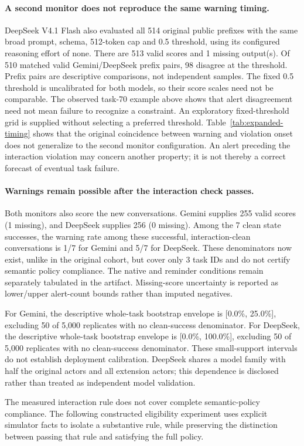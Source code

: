 \paragraph{A second monitor does not reproduce the same warning timing.}
DeepSeek V4.1 Flash also evaluated all 514 original public prefixes with the same broad prompt, schema, 512-token cap and 0.5 threshold, using its configured reasoning effort of none. There are 513 valid scores and 1 missing output(s). Of 510 matched valid Gemini/DeepSeek prefix pairs, 98 disagree at the threshold. Prefix pairs are descriptive comparisons, not independent samples. The fixed 0.5 threshold is uncalibrated for both models, so their score scales need not be comparable. The observed task-70 example above shows that alert disagreement need not mean failure to recognize a constraint. An exploratory fixed-threshold grid is supplied without selecting a preferred threshold. Table~\ref{tab:expanded-timing} shows that the original coincidence between warning and violation onset does not generalize to the second monitor configuration. An alert preceding the interaction violation may concern another property; it is not thereby a correct forecast of eventual task failure.

\paragraph{Warnings remain possible after the interaction check passes.}
Both monitors also score the new conversations. Gemini supplies 255 valid scores (1 missing), and DeepSeek supplies 256 (0 missing). Among the 7 clean state successes, the warning rate among these successful, interaction-clean conversations is 1/7 for Gemini and 5/7 for DeepSeek. These denominators now exist, unlike in the original cohort, but cover only 3 task IDs and do not certify semantic policy compliance. The native and reminder conditions remain separately tabulated in the artifact. Missing-score uncertainty is reported as lower/upper alert-count bounds rather than imputed negatives.

For Gemini, the descriptive whole-task bootstrap envelope is [0.0\%, 25.0\%], excluding 50 of 5,000 replicates with no clean-success denominator. For DeepSeek, the descriptive whole-task bootstrap envelope is [0.0\%, 100.0\%], excluding 50 of 5,000 replicates with no clean-success denominator. These small-support intervals do not establish deployment calibration. DeepSeek shares a model family with half the original actors and all extension actors; this dependence is disclosed rather than treated as independent model validation.

The measured interaction rule does not cover complete semantic-policy compliance. The following constructed eligibility experiment uses explicit simulator facts to isolate a substantive rule, while preserving the distinction between passing that rule and satisfying the full policy.
